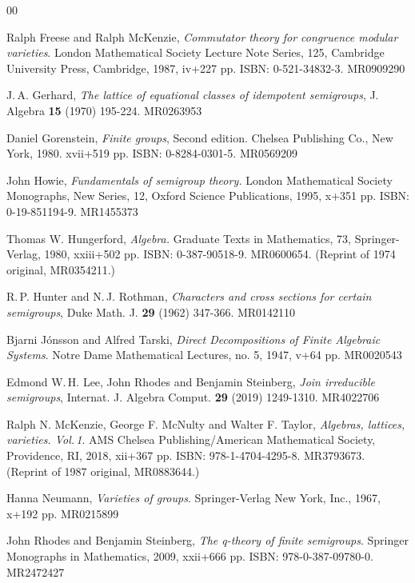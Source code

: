 \documentclass{amsart}
\numberwithin{equation}{section}
\numberwithin{theorem}{section}
\begin{document}
\begin{thebibliography}{00}

 Ralph Freese and Ralph McKenzie,
{\em Commutator theory for congruence modular varieties}.
London Mathematical Society Lecture Note Series, 125,
Cambridge University Press, Cambridge, 1987, iv+227 pp.
ISBN: 0-521-34832-3.
MR0909290

 J.\,A. Gerhard,
{\em The lattice of equational classes of idempotent semigroups},
J. Algebra {\bf 15} (1970) 195-224.
MR0263953

 Daniel Gorenstein,
{\em Finite groups}, Second edition.
Chelsea Publishing Co.,
New York, 1980. xvii+519 pp. ISBN: 0-8284-0301-5.
MR0569209

 John Howie,
{\em Fundamentals of semigroup theory.} London Mathematical Society
Monographs, New Series, 12, Oxford Science Publications, 1995,
x+351 pp. ISBN: 0-19-851194-9.
MR1455373

 Thomas W. Hungerford,
{\em Algebra.} Graduate Texts in Mathematics, 73,
Springer-Verlag, 1980, xxiii+502 pp. ISBN: 0-387-90518-9.
MR0600654.
(Reprint of 1974 original, MR0354211.)

 R.\,P. Hunter and N.\,J. Rothman,
{\em Characters and cross sections for certain semigroups},
Duke Math. J. {\bf 29} (1962) 347-366.
MR0142110

 Bjarni J\'onsson and Alfred Tarski,
{\em Direct Decompositions of Finite Algebraic Systems}.
Notre Dame Mathematical Lectures, no. 5, 1947, v+64 pp.
MR0020543

 Edmond W.\,H. Lee, John Rhodes and Benjamin Steinberg,
{\em Join irreducible semigroups},
Internat. J. Algebra Comput. {\bf 29} (2019) 1249-1310.
MR4022706

 Ralph N. McKenzie, George F. McNulty and Walter F. Taylor,
{\em Algebras, lattices, varieties. Vol.\,1}.
AMS Chelsea Publishing/American Mathematical Society,
Providence, RI, 2018, xii+367 pp.  ISBN: 978-1-4704-4295-8.
MR3793673.
(Reprint of 1987 original, MR0883644.)

 Hanna Neumann,
{\em Varieties of groups}.
Springer-Verlag New York, Inc., 1967, x+192 pp.
MR0215899

 John Rhodes and Benjamin Steinberg,
{\em The q-theory of finite semigroups}.
Springer Monographs in Mathematics, 2009,
xxii+666 pp. ISBN: 978-0-387-09780-0.
MR2472427


\end{thebibliography}
\end{document}
